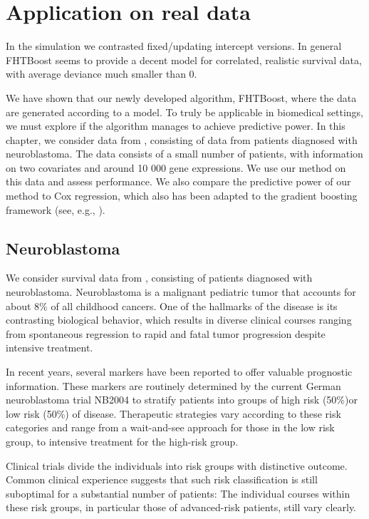 \chapter{Application on real data}
In the simulation we contrasted fixed/updating intercept versions.
In general FHTBoost seems to provide a decent model for correlated, realistic survival data, with average deviance much smaller than 0.


We have shown that our newly developed algorithm, FHTBoost, where the data are generated according to a model.
To truly be applicable in biomedical settings, we must explore if the algorithm manages to achieve predictive power.
In this chapter, we consider data from \citet{oberthuer-data}, consisting of data from patients diagnosed with neuroblastoma.
The data consists of a small number of patients, with information on two covariates and around 10 000 gene expressions.
We use our method on this data and assess performance.
We also compare the predictive power of our method to Cox regression, which also has been adapted to the gradient boosting framework (see, e.g., \citet{BinderSchumacher2008}).

\section{Neuroblastoma}
We consider survival data from \citet{oberthuer-data}, consisting of patients diagnosed with neuroblastoma.
Neuroblastoma is a malignant pediatric tumor that accounts for about 8\% of all childhood cancers.
One of the hallmarks of the disease is its contrasting biological behavior, which results in diverse clinical courses ranging from spontaneous regression to rapid and fatal tumor progression despite intensive treatment.

In recent years, several markers have been reported to offer valuable prognostic information.
These markers are routinely determined by the current German neuroblastoma trial NB2004 to stratify patients into groups of high risk (50\%)or low risk (50\%) of disease.
Therapeutic strategies vary according to these risk categories and range from a wait-and-see approach for those in the low risk group,
to intensive treatment for the high-risk group.

Clinical trials divide the individuals into risk groups with distinctive outcome.
Common clinical experience suggests that such risk classification is still suboptimal for a substantial number of patients:
The individual courses within these risk groups,
in particular those of advanced-risk patients, still vary clearly.

